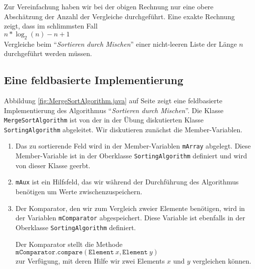 Zur Vereinfachung haben wir bei der obigen Rechnung nur eine obere Absch\"atzung
der Anzahl der Vergleiche durchgef\"uhrt.  Eine exakte Rechnung zeigt, dass im
schlimmsten Fall \\[0.1cm]
\hspace*{1.3cm}  $n * \log_2(n) - n + 1$ \\[0.1cm]
Vergleiche beim ``\emph{Sortieren durch Mischen}'' einer nicht-leeren Liste der L\"ange $n$
durchgef\"uhrt werden m\"ussen.

\subsection{Eine feldbasierte Implementierung}
Abbildung \ref{fig:MergeSortAlgorithm.java} auf Seite \pageref{fig:MergeSortAlgorithm.java}
zeigt eine feldbasierte  Implementierung des Algorithmus ``\emph{Sortieren durch
  Mischen}''.  Die Klasse \texttt{MergeSortAlgorithm} ist von der in der Übung
diskutierten Klasse \texttt{SortingAlgorithm} abgeleitet.
Wir diskutieren zun\"achst die Member-Variablen.
\begin{enumerate}
\item Das zu sortierende Feld wird in der Member-Variablen \texttt{mArray} 
      abgelegt.  Diese Member-Variable ist in der Oberklasse \texttt{SortingAlgorithm}
      definiert und wird von dieser Klasse geerbt.
\item \texttt{mAux} ist ein Hilfsfeld, das wir w\"ahrend der Durchf\"uhrung des Algorithmus
      ben\"otigen um Werte zwischenzuspeichern.
\item Der Komparator, den wir zum Vergleich zweier Elemente ben\"otigen,
      wird in der Variablen \texttt{mComparator} abgespeichert.  Diese Variable ist
      ebenfalls in der Oberklasse \texttt{SortingAlgorithm} definiert.
      
      Der Komparator stellt die Methode \\[0.1cm]
      \hspace*{1.3cm} 
      $\texttt{mComparator.compare}(\mathtt{Element}\ x, \mathtt{Element}\ y)$  \\[0.1cm]
      zur Verf\"ugung, mit deren Hilfe wir zwei Elements $x$ und $y$ vergleichen k\"onnen.
\end{enumerate}

